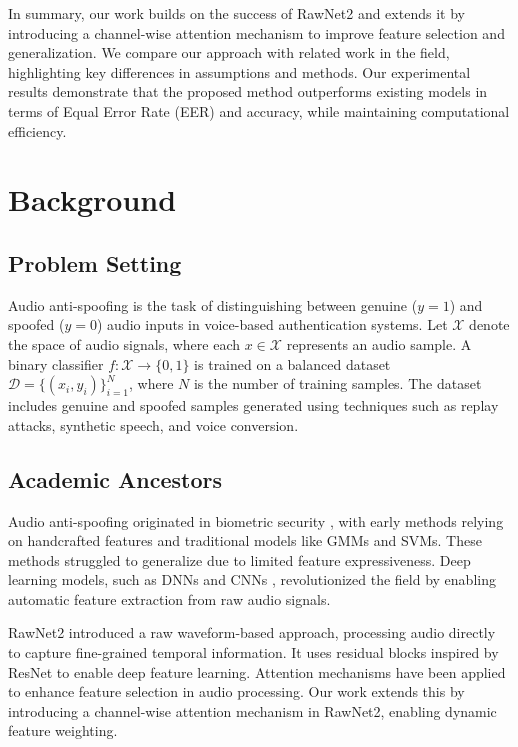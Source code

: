 \documentclass{article} %
\begin{document}
In summary, our work builds on the success of RawNet2 and extends it by introducing a channel-wise attention mechanism to improve feature selection and generalization. We compare our approach with related work in the field, highlighting key differences in assumptions and methods. Our experimental results demonstrate that the proposed method outperforms existing models in terms of Equal Error Rate (EER) and accuracy, while maintaining computational efficiency.

\section{Background}
\label{sec:background}
\subsection{Problem Setting}
Audio anti-spoofing is the task of distinguishing between genuine ($y = 1$) and spoofed ($y = 0$) audio inputs in voice-based authentication systems. Let $\mathcal{X}$ denote the space of audio signals, where each $x \in \mathcal{X}$ represents an audio sample. A binary classifier $f: \mathcal{X} \rightarrow \{0, 1\}$ is trained on a balanced dataset $\mathcal{D} = \{(x_i, y_i)\}_{i=1}^N$, where $N$ is the number of training samples. The dataset includes genuine and spoofed samples generated using techniques such as replay attacks, synthetic speech, and voice conversion.

\subsection{Academic Ancestors}
Audio anti-spoofing originated in biometric security \citep{lu2024aiscientist}, with early methods relying on handcrafted features and traditional models like GMMs and SVMs. These methods struggled to generalize due to limited feature expressiveness. Deep learning models, such as DNNs and CNNs \citep{he2016deep, simonyan2014very}, revolutionized the field by enabling automatic feature extraction from raw audio signals.

RawNet2 \citep{he2016deep} introduced a raw waveform-based approach, processing audio directly to capture fine-grained temporal information. It uses residual blocks inspired by ResNet to enable deep feature learning. Attention mechanisms \citep{vaswani2017attention} have been applied to enhance feature selection in audio processing. Our work extends this by introducing a channel-wise attention mechanism in RawNet2, enabling dynamic feature weighting.
\end{document}
